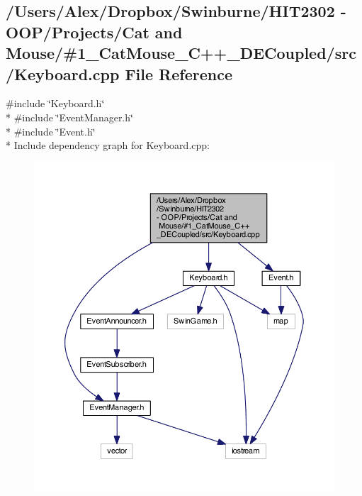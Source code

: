 \subsection{/\-Users/\-Alex/\-Dropbox/\-Swinburne/\-H\-I\-T2302 -\/ O\-O\-P/\-Projects/\-Cat and Mouse/\#1\-\_\-\-Cat\-Mouse\-\_\-\-C++\-\_\-\-D\-E\-Coupled/src/\-Keyboard.cpp File Reference}
\label{_keyboard_8cpp}
{\ttfamily \#include \char`\"{}Keyboard.\-h\char`\"{}}\\*
{\ttfamily \#include \char`\"{}Event\-Manager.\-h\char`\"{}}\\*
{\ttfamily \#include \char`\"{}Event.\-h\char`\"{}}\\*
Include dependency graph for Keyboard.\-cpp\-:
\nopagebreak
\begin{figure}[H]
\begin{center}
\leavevmode
\includegraphics[width=350pt]{_keyboard_8cpp__incl}
\end{center}
\end{figure}
